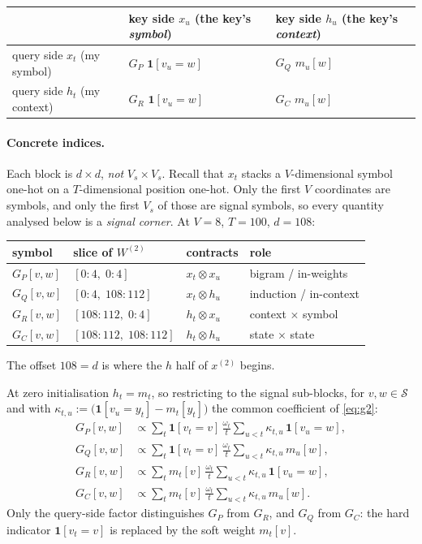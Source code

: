 \documentclass[11pt,a4paper]{article}
\theoremstyle{plain}
\theoremstyle{definition}
\newcommand{\Sig}{\mathcal{S}}
\newcommand{\1}{\mathbf{1}}
\begin{document}
\begin{center}
\begin{tabular}{@{}lll@{}}
\toprule
 & key side $x_u$ (the key's \emph{symbol}) & key side $h_u$ (the key's \emph{context}) \\
\midrule
query side $x_t$ (my symbol)  & $G_P$ \; $\1[v_u{=}w]$ & $G_Q$ \; $m_u[w]$ \\
query side $h_t$ (my context) & $G_R$ \; $\1[v_u{=}w]$ & $G_C$ \; $m_u[w]$ \\
\bottomrule
\end{tabular}
\end{center}

\paragraph{Concrete indices.}
Each block is $d\times d$, \emph{not} $V_s\times V_s$. Recall that $x_t$ stacks a
$V$-dimensional symbol one-hot on a $T$-dimensional position one-hot. Only the first $V$
coordinates are symbols, and only the first $V_s$ of those are signal symbols, so every quantity
analysed below is a \emph{signal corner}. At $V=8$, $T=100$, $d=108$:

\begin{center}
\begin{tabular}{@{}llll@{}}
\toprule
symbol & slice of $W^{(2)}$ & contracts & role \\
\midrule
$G_P[v,w]$ & $[0{:}4,\;0{:}4]$        & $x_t\otimes x_u$ & bigram / in-weights \\
$G_Q[v,w]$ & $[0{:}4,\;108{:}112]$    & $x_t\otimes h_u$ & induction / in-context \\
$G_R[v,w]$ & $[108{:}112,\;0{:}4]$    & $h_t\otimes x_u$ & context $\times$ symbol \\
$G_C[v,w]$ & $[108{:}112,\;108{:}112]$& $h_t\otimes h_u$ & state $\times$ state \\
\bottomrule
\end{tabular}
\end{center}

\noindent The offset $108=d$ is where the $h$ half of $x^{(2)}$ begins.

\medskip\noindent
At zero initialisation $h_t=m_t$, so restricting to the signal sub-blocks, for $v,w\in\Sig$ and
with $\kappa_{t,u}:=\bigl(\1[v_u{=}y_t]-m_t[y_t]\bigr)$ the common coefficient of \eqref{eq:g2}:
\begin{align}
G_P[v,w]&\propto\sum_t\1[v_t{=}v]\,\frac{\omega_t}{t}\sum_{u<t}\kappa_{t,u}\,\1[v_u{=}w],
\label{eq:GP}\\
G_Q[v,w]&\propto\sum_t\1[v_t{=}v]\,\frac{\omega_t}{t}\sum_{u<t}\kappa_{t,u}\,m_u[w],
\label{eq:GQ}\\
G_R[v,w]&\propto\sum_t m_t[v]\,\frac{\omega_t}{t}\sum_{u<t}\kappa_{t,u}\,\1[v_u{=}w],
\label{eq:GR}\\
G_C[v,w]&\propto\sum_t m_t[v]\,\frac{\omega_t}{t}\sum_{u<t}\kappa_{t,u}\,m_u[w].
\label{eq:GC}
\end{align}
Only the query-side factor distinguishes $G_P$ from $G_R$, and $G_Q$ from $G_C$: the hard
indicator $\1[v_t{=}v]$ is replaced by the soft weight $m_t[v]$.
\end{document}
